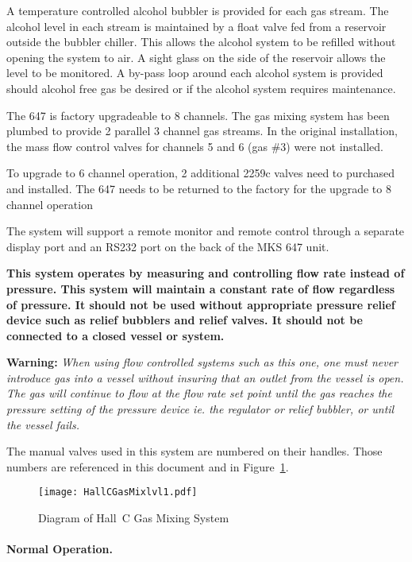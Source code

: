A temperature controlled alcohol bubbler is provided for each gas
stream.  The alcohol level in each stream is maintained by a float valve
fed from a reservoir outside the bubbler chiller. This allows the alcohol
system to be refilled without opening the system to air.  A sight glass on
the side of the reservoir allows the level to be monitored.  A by-pass loop
around each alcohol system is provided should alcohol free gas be desired
or if the alcohol system requires maintenance.

The 647 is factory upgradeable to 8 channels.  The gas mixing
system has been plumbed to provide 2 parallel 3 channel gas streams.  In
the original installation, the mass flow control valves for channels 5 and
6 (gas \#3) were not installed.

To upgrade to 6 channel operation, 2 additional 2259c valves need
to purchased and installed.  The 647 needs to be returned to the factory
for the upgrade to 8 channel operation

The system will support a remote monitor and remote control through
a separate display port and an RS232 port on the back of the MKS 647 unit.

{\bf This system operates by measuring and controlling flow rate instead
of pressure. This system will maintain a constant rate of flow
regardless of pressure. It should not be used without appropriate pressure
relief device such as relief bubblers and relief valves. It should not be
connected to a closed vessel or system.}

{\bf Warning:} {\em{When using flow controlled systems such as this one, one 
must never introduce gas into a vessel without insuring that an outlet from the vessel is 
open.  The gas will continue to flow at the flow rate set point until the gas 
reaches the pressure setting of the pressure device ie. the regulator or relief 
bubbler, or until the vessel fails}.}

The manual valves used in this system are numbered on their
handles.  Those numbers are referenced in this document and in
Figure~\ref{fig:gas_mix}.
\begin{figure}
\texttt{[image: HallCGasMixlvl1.pdf]}
\caption{Diagram of Hall~C Gas Mixing System\label{fig:gas_mix}}
\end{figure}

\paragraph{Normal Operation.}

